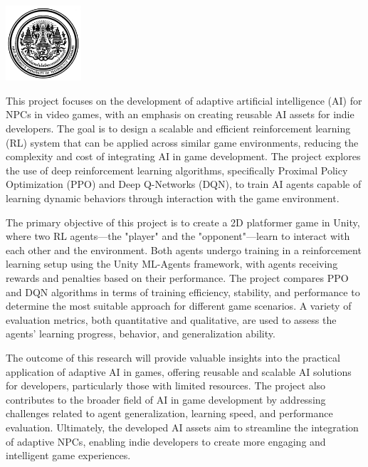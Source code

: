 \documentclass[12pt,oneside,openright,a4paper]{cpe-english-project}
\begin{document}
\pdfstringdefDisableCommands{%
\let\MakeUppercase\relax
}
\begin{center}
  \includegraphics[width=2.8cm]{logo02.jpg}
\end{center}
\vspace*{-1cm}

\maketitlepage
\makesignaturepage 

\abstract

This project focuses on the development of adaptive artificial intelligence (AI) for NPCs in video games, with an emphasis on creating reusable AI assets for indie developers. The goal is to design a scalable and efficient reinforcement learning (RL) system that can be applied across similar game environments, reducing the complexity and cost of integrating AI in game development. The project explores the use of deep reinforcement learning algorithms, specifically Proximal Policy Optimization (PPO) and Deep Q-Networks (DQN), to train AI agents capable of learning dynamic behaviors through interaction with the game environment.

The primary objective of this project is to create a 2D platformer game in Unity, where two RL agents—the "player" and the "opponent"—learn to interact with each other and the environment. Both agents undergo training in a reinforcement learning setup using the Unity ML-Agents framework, with agents receiving rewards and penalties based on their performance. The project compares PPO and DQN algorithms in terms of training efficiency, stability, and performance to determine the most suitable approach for different game scenarios. A variety of evaluation metrics, both quantitative and qualitative, are used to assess the agents' learning progress, behavior, and generalization ability.

The outcome of this research will provide valuable insights into the practical application of adaptive AI in games, offering reusable and scalable AI solutions for developers, particularly those with limited resources. The project also contributes to the broader field of AI in game development by addressing challenges related to agent generalization, learning speed, and performance evaluation. Ultimately, the developed AI assets aim to streamline the integration of adaptive NPCs, enabling indie developers to create more engaging and intelligent game experiences.
\end{document}
